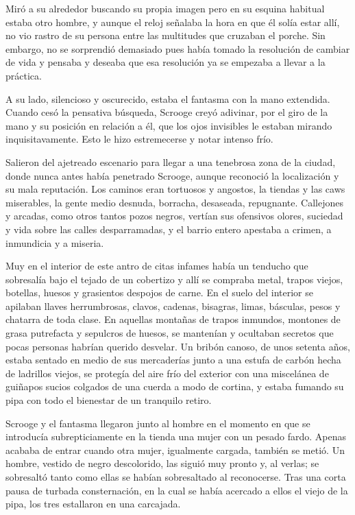 \documentclass{novela}
\begin{document}
 Miró a su alrededor buscando su propia imagen pero en su esquina habitual estaba otro hombre, y aunque el reloj señalaba la hora en que él solía estar allí, no vio rastro de su persona entre las multitudes que cruzaban el porche. Sin embargo, no se sorprendió demasiado pues había tomado la resolución de cambiar de vida y pensaba y deseaba que esa resolución ya se empezaba a llevar a la práctica.

 A su lado, silencioso y oscurecido, estaba el fantasma con la mano extendida. Cuando cesó la pensativa búsqueda, Scrooge creyó adivinar, por el giro de la mano y su posición en relación a él, que los ojos invisibles le estaban mirando inquisitavamente. Esto le hizo estremecerse y notar intenso frío.

 Salieron del ajetreado escenario para llegar a una tenebrosa zona de la ciudad, donde nunca antes había penetrado Scrooge, aunque reconoció la localización y su mala reputación. Los caminos eran tortuosos y angostos, la tiendas y las caws miserables, la gente medio desnuda, borracha, desaseada, repugnante. Callejones y arcadas, como otros tantos pozos negros, vertían sus ofensivos olores, suciedad y vida sobre las calles desparramadas, y el barrio entero apestaba a crimen, a inmundicia y a miseria.

 Muy en el interior de este antro de citas infames había un tenducho que sobresalía bajo el tejado de un cobertizo y allí se compraba metal, trapos viejos, botellas, huesos y grasientos despojos de carne. En el suelo del interior se apilaban llaves herrumbrosas, clavos, cadenas, bisagras, limas, básculas, pesos y chatarra de toda clase. En aquellas montañas de trapos inmundos, montones de grasa putrefacta y sepulcros de huesos, se mantenían y ocultaban secretos que pocas personas habrían querido desvelar. Un bribón canoso, de unos setenta años, estaba sentado en medio de sus mercaderías junto a una estufa de carbón hecha de ladrillos viejos, se protegía del aire frío del exterior con una miscelánea de guiñapos sucios colgados de una cuerda a modo de cortina, y estaba fumando su pipa con todo el bienestar de un tranquilo retiro.

 Scrooge y el fantasma llegaron junto al hombre en el momento en que se introducía subrepticiamente en la tienda una mujer con un pesado fardo. Apenas acababa de entrar cuando otra mujer, igualmente cargada, también se metió. Un hombre, vestido de negro descolorido, las siguió muy pronto y, al verlas; se sobresaltó tanto como ellas se habían sobresaltado al reconocerse. Tras una corta pausa de turbada consternación, en la cual se había acercado a ellos el viejo de la pipa, los tres estallaron en una carcajada.
\end{document}
